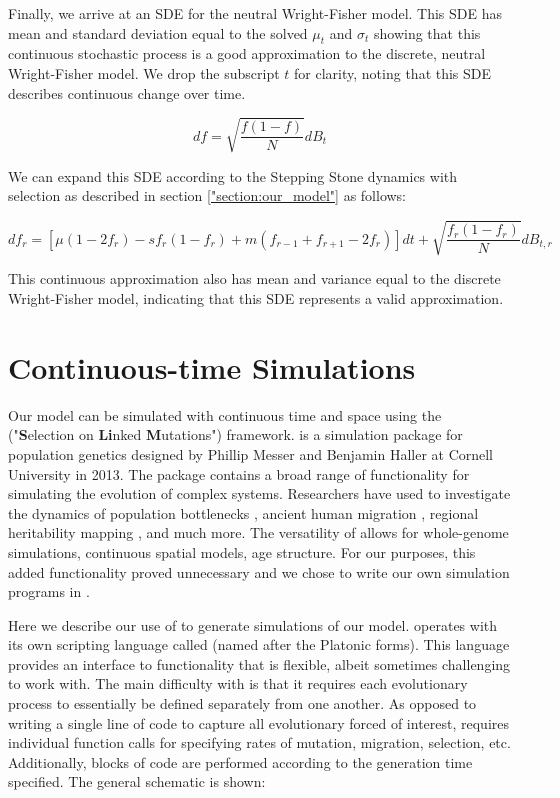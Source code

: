 Finally, we arrive at an SDE for the neutral Wright-Fisher model. This SDE has mean and standard deviation equal to the solved $\mu_t$ and $\sigma_t$ showing that this continuous stochastic process is a good approximation to the discrete, neutral Wright-Fisher model. We drop the subscript $t$ for clarity, noting that this SDE describes continuous change over time. 

\begin{equation}
    df = \sqrt{\frac{f(1-f)}{N}} dB_t
\end{equation}

We can expand this SDE according to the Stepping Stone dynamics with selection as described in section \ref{"section:our_model"} as follows: 

\begin{equation}
    \label{eq:continuous_model}
    df_r=[\mu(1-2f_r)-sf_r (1-f_r ) + m (f_{r-1}+f_{r+1}-2f_r)]dt+\sqrt{\frac{f_r (1-f_r )}{N}} dB_{t,r}
\end{equation}

This continuous approximation also has mean and variance equal to the discrete Wright-Fisher model, indicating that this SDE represents a valid approximation.

\section{Continuous-time Simulations}\label{section:slim}

Our model can be simulated with continuous time and space using the  ("\textbf{S}election on \textbf{Li}nked \textbf{M}utations") framework.  is a simulation package for population genetics designed by Phillip Messer and Benjamin Haller at Cornell University in 2013.\cite{haller_slim_2019} The package contains a broad range of functionality for simulating the evolution of complex systems. Researchers have used  to investigate the dynamics of population bottlenecks \cite{pedersen_effect_2017}, ancient human migration \cite{sikora_ancient_2017}, regional heritability mapping \cite{caballero_nature_2015}, and much more. The versatility of  allows for whole-genome simulations, continuous spatial models, age structure. For our purposes, this added functionality proved unnecessary and we chose to write our own simulation programs in .

Here we describe our use of  to generate simulations of our model.  operates with its own scripting language called  (named after the Platonic forms). This language provides an interface to  functionality that is flexible, albeit sometimes challenging to work with. The main difficulty with  is that it requires each evolutionary process to essentially be defined separately from one another. As opposed to writing a single line of code to capture all evolutionary forced of interest,  requires individual function calls for specifying rates of mutation, migration, selection, etc. Additionally, blocks of code are performed according to the generation time specified. The general schematic is shown:


